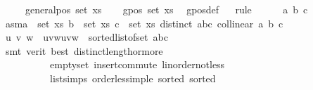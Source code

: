 \begin{isabellebody}
\ \ \ \ \ {\isachardoublequoteopen}general{\isacharunderscore}{\kern0pt}pos\ {\isacharparenleft}{\kern0pt}set\ xs{\isacharparenright}{\kern0pt}{\isachardoublequoteclose}\isanewline
%
\isadelimproof
%
\endisadelimproof
%
\isatagproof
{}\isamarkupfalse%
{\isacharminus}{\kern0pt}\isanewline
\ \ \isamarkupfalse%
\ {\isachardoublequoteopen}gpos\ {\isacharparenleft}{\kern0pt}set\ xs{\isacharparenright}{\kern0pt}{\isachardoublequoteclose}\ \isamarkupfalse%
\ gpos{\isacharunderscore}{\kern0pt}def\isanewline
\ \ \isamarkupfalse%
{\isacharparenleft}{\kern0pt}rule{\isacharplus}{\kern0pt}{\isacharparenright}{\kern0pt}\isanewline
\ \ \ \ \isamarkupfalse%
\ a\ b\ c\isanewline
\ \ \ \ \isamarkupfalse%
\ asm{\isacharcolon}{\kern0pt}{\isachardoublequoteopen}a\ {\isasymin}\ set\ xs{\isachardoublequoteclose}\ {\isachardoublequoteopen}b\ {\isasymin}\ set\ xs{\isachardoublequoteclose}\ {\isachardoublequoteopen}c\ {\isasymin}\ set\ xs{\isachardoublequoteclose}\ {\isachardoublequoteopen}distinct\ {\isacharbrackleft}{\kern0pt}a{\isacharcomma}{\kern0pt}b{\isacharcomma}{\kern0pt}c{\isacharbrackright}{\kern0pt}{\isachardoublequoteclose}\ {\isachardoublequoteopen}collinear{}\ a\ b\ c{\isachardoublequoteclose}\isanewline
\ \ \ \ \isamarkupfalse%
\ \isamarkupfalse%
\ u\ v\ w\ \ uvw{\isacharcolon}{\kern0pt}{\isachardoublequoteopen}{\isacharbrackleft}{\kern0pt}u{\isacharcomma}{\kern0pt}v{\isacharcomma}{\kern0pt}w{\isacharbrackright}{\kern0pt}\ {\isacharequal}{\kern0pt}\ sorted{\isacharunderscore}{\kern0pt}list{\isacharunderscore}{\kern0pt}of{\isacharunderscore}{\kern0pt}set\ {\isacharbraceleft}{\kern0pt}a{\isacharcomma}{\kern0pt}b{\isacharcomma}{\kern0pt}c{\isacharbraceright}{\kern0pt}{\isachardoublequoteclose}\isanewline
\ \ \ \ \ \ \isamarkupfalse%
\ {\isacharparenleft}{\kern0pt}smt\ {\isacharparenleft}{\kern0pt}verit{\isacharcomma}{\kern0pt}\ best{\isacharparenright}{\kern0pt}\ distinct{\isacharunderscore}{\kern0pt}length{\isacharunderscore}{\kern0pt}{}{\isacharunderscore}{\kern0pt}or{\isacharunderscore}{\kern0pt}more\isanewline
\ \ \ \ \ \ \ \ \ \ empty{\isacharunderscore}{\kern0pt}set\ insert{\isacharunderscore}{\kern0pt}commute\ linorder{\isacharunderscore}{\kern0pt}not{\isacharunderscore}{\kern0pt}less\isanewline
\ \ \ \ \ \ \ \ \ \ list{\isachardot}{\kern0pt}simps{\isacharparenleft}{\kern0pt}{}{}{\isacharparenright}{\kern0pt}\ order{\isacharunderscore}{\kern0pt}less{\isacharunderscore}{\kern0pt}imp{\isacharunderscore}{\kern0pt}le\ sorted{}\ sorted{}\isanewline

\end{isabellebody}

